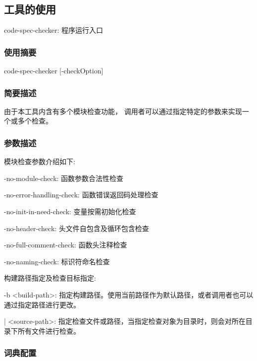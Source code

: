 \subsection{工具的使用}
\label{sec:usage}

code-spec-checker: 程序运行入口

\subsubsection{使用摘要}

code-spec-checker [-checkOption]

\indent \qquad \qquad \qquad {}

\indent \qquad \qquad \qquad {}

\subsubsection{简要描述}

由于本工具内含有多个模块检查功能，
调用者可以通过指定特定的参数来实现一个或多个检查。

\subsubsection{参数描述}
模块检查参数介绍如下:

\qquad -no-module-check: 函数参数合法性检查

\qquad -no-error-handling-check: 函数错误返回码处理检查 

\qquad -no-init-in-need-check: 变量按需初始化检查

\qquad -no-header-check: 头文件自包含及循环包含检查

\qquad -no-full-comment-check: 函数头注释检查

\qquad -no-naming-check: 标识符命名检查 \newline

构建路径指定及检查目标指定: \newline

\qquad -b <build-path>: 指定构建路径。使用当前路径作为默认路径，或者调用者也可以通过指定路径进行更改。\newline

 | <source-path>: 指定检查文件或路径，当指定检查对象为目录时，则会对所在目录下所有文件进行检查。 \newline


\subsubsection{词典配置}

